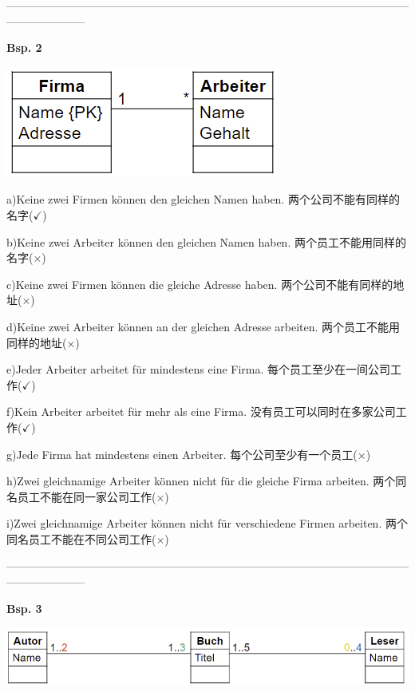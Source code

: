 \documentclass[fleqn]{article}
\begin{document}
\noindent---------------------------------------------------------------------------------------------------------------------------------

\noindent\textbf{Bsp. 2}

\begin{center} 
    \includegraphics[scale=0.6]{2.png}
\end{center}

a)Keine zwei Firmen können den gleichen Namen haben. 两个公司不能有同样的名字($\checkmark$)

b)Keine zwei Arbeiter können den gleichen Namen haben. 两个员工不能用同样的名字($\times$)

c)Keine zwei Firmen können die gleiche Adresse haben. 两个公司不能有同样的地址($\times$)

d)Keine zwei Arbeiter können an der gleichen Adresse arbeiten. 两个员工不能用同样的地址($\times$)

e)Jeder Arbeiter arbeitet für mindestens eine Firma. 每个员工至少在一间公司工作($\checkmark$)

f)Kein Arbeiter arbeitet für mehr als eine Firma. 没有员工可以同时在多家公司工作($\checkmark$)

g)Jede Firma hat mindestens einen Arbeiter. 每个公司至少有一个员工($\times$)

h)Zwei gleichnamige Arbeiter können nicht für die gleiche Firma arbeiten. 两个同名员工不能在同一家公司工作($\times$)

i)Zwei gleichnamige Arbeiter können nicht für verschiedene Firmen arbeiten. 两个同名员工不能在不同公司工作($\times$)

\noindent---------------------------------------------------------------------------------------------------------------------------------

\noindent\textbf{Bsp. 3}

\begin{center} 
    \includegraphics[scale=0.5]{3.png}
\end{center}
\end{document}
